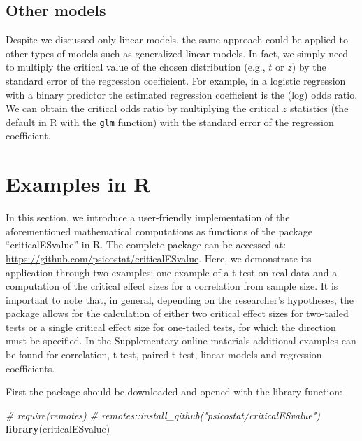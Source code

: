 \documentclass[
  man]{apa7}
\newenvironment{Shaded}{\begin{snugshade}}{\end{snugshade}}
\newcommand{\CommentTok}[1]{\textcolor[rgb]{0.56,0.35,0.01}{\textit{#1}}}
\newcommand{\FunctionTok}[1]{\textcolor[rgb]{0.13,0.29,0.53}{\textbf{#1}}}
\newcommand{\NormalTok}[1]{#1}
\begin{document}
\hypertarget{other-models}{%
\subsection{Other models}\label{other-models}}

Despite we discussed only linear models, the same approach could be applied to other types of models such as generalized linear models. In fact, we simply need to multiply the critical value of the chosen distribution (e.g., \(t\) or \(z\)) by the standard error of the regression coefficient. For example, in a logistic regression with a binary predictor the estimated regression coefficient is the (log) odds ratio. We can obtain the critical odds ratio by multiplying the critical \(z\) statistics (the default in R with the \texttt{glm} function) with the standard error of the regression coefficient.

\hypertarget{examples-in-r}{%
\section{Examples in R}\label{examples-in-r}}

In this section, we introduce a user-friendly implementation of the aforementioned mathematical computations as functions of the package ``criticalESvalue'' in R. The complete package can be accessed at: \url{https://github.com/psicostat/criticalESvalue}. Here, we demonstrate its application through two examples: one example of a t-test on real data and a computation of the critical effect sizes for a correlation from sample size. It is important to note that, in general, depending on the researcher's hypotheses, the package allows for the calculation of either two critical effect sizes for two-tailed tests or a single critical effect size for one-tailed tests, for which the direction must be specified. In the Supplementary online materials additional examples can be found for correlation, t-test, paired t-test, linear models and regression coefficients.

First the package should be downloaded and opened with the library function:

\footnotesize

\begin{Shaded}
\begin{Highlighting}[]
\CommentTok{\# require(remotes)}
\CommentTok{\# remotes::install\_github("psicostat/criticalESvalue")}
\FunctionTok{library}\NormalTok{(criticalESvalue)}
\end{Highlighting}
\end{Shaded}
\end{document}
